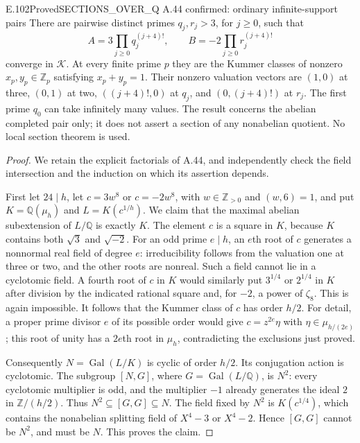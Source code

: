 \begin{result}{E.102}{Proved}{SECTIONS\_OVER\_Q A.44 confirmed: ordinary infinite-support pairs}
There are pairwise distinct primes $q_j,r_j>3$, for $j\ge0$, such that
\[
A=3\prod_{j\ge0}q_j^{(j+4)!},\qquad
B=-2\prod_{j\ge0}r_j^{(j+4)!}
\]
converge in $\mathcal K$. At every finite prime $p$ they are the Kummer
classes of nonzero $x_p,y_p\in\mathbb Z_p$ satisfying $x_p+y_p=1$.
Their nonzero valuation vectors are $(1,0)$ at three, $(0,1)$ at two,
$((j+4)!,0)$ at $q_j$, and $(0,(j+4)!)$ at $r_j$. The first prime
$q_0$ can take infinitely many values. The result concerns the abelian
completed pair only; it does not assert a section of any nonabelian
quotient. No local section theorem is used.
\end{result}
\begin{proof}
We retain the explicit factorials of A.44, and independently check the
field intersection and the induction on which its assertion depends.

First let $24\mid h$, let $c=3w^8$ or $c=-2w^8$, with
$w\in\mathbb Z_{>0}$ and $(w,6)=1$, and put
$K=\mathbb Q(\mu_h)$ and $L=K(c^{1/h})$. We claim that the maximal
abelian subextension of $L/\mathbb Q$ is exactly $K$.
The element $c$ is a square in $K$, because $K$ contains both
$\sqrt3$ and $\sqrt{-2}$. For an odd prime $e\mid h$, an $e$th root
of $c$ generates a nonnormal real field of degree $e$: irreducibility
follows from the valuation one at three or two, and the other roots are
nonreal. Such a field cannot lie in a cyclotomic field. A fourth root
of $c$ in $K$ would similarly put $3^{1/4}$ or $2^{1/4}$ in $K$ after
division by the indicated rational square and, for $-2$, a power of
$\zeta_8$. This is again impossible. It follows that the Kummer class
of $c$ has order $h/2$. For detail, a proper prime divisor $e$ of its
possible order would give $c=z^{2e}\eta$ with
$\eta\in\mu_{h/(2e)}$; this root of unity has a $2e$th root in
$\mu_h$, contradicting the exclusions just proved.

Consequently $N=\operatorname{Gal}(L/K)$ is cyclic of order $h/2$.
Its conjugation action is cyclotomic. The subgroup $[N,G]$, where
$G=\operatorname{Gal}(L/\mathbb Q)$, is $N^2$: every cyclotomic
multiplier is odd, and the multiplier $-1$ already generates the ideal
$2$ in $\mathbb Z/(h/2)$. Thus
$N^2\subseteq[G,G]\subseteq N$. The field fixed by $N^2$ is
$K(c^{1/4})$, which contains the nonabelian splitting field of
$X^4-3$ or $X^4-2$. Hence $[G,G]$ cannot be $N^2$, and must be $N$.
This proves the claim.


\end{proof}
